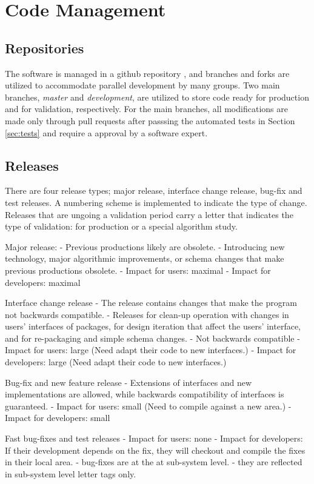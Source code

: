 \section{Code Management}

\subsection{Repositories}
The software is managed in a github repository \cite{recon-github}, and branches and forks are utilized to accommodate parallel development by many groups.  Two main branches, {\it master} and {\it development}, are utilized to store code ready for production and for validation, respectively. For the main branches, all modifications are made only through pull requests after passsing the automated tests in Section \ref{sec:tests} and require a approval by a software expert.

\subsection{Releases}
There are four release types; major release, interface change release, bug-fix
and test releases.  A numbering scheme is implemented to indicate the type of change.
Releases that are ungoing a validation period carry a letter that indicates the type of validation:
for production or a special algorithm study.

Major release:
- Previous productions likely are obsolete.
- Introducing new technology, major algorithmic improvements, or
schema changes that make previous productions obsolete.
- Impact for users: maximal
- Impact for developers: maximal

Interface change release
- The release contains changes that make the program not backwards compatible.
- Releases for clean-up operation with changes in users' interfaces of
packages, for design iteration that affect the users' interface, and
for re-packaging and simple schema changes.
- Not backwards compatible
- Impact for users: large (Need adapt their code to new interfaces.)
- Impact for developers: large (Need adapt their code to new interfaces.)

Bug-fix and new feature release
- Extensions of interfaces and new implementations are allowed, while
backwards compatibility of interfaces is guaranteed.
- Impact for users: small (Need to compile against a new area.)
- Impact for developers: small

Fast bug-fixes and test releases
- Impact for users: none
- Impact for developers: If their development depends on the fix, they will checkout
and compile the fixes in their local area.
- bug-fixes are at the at sub-system level.
- they are reflected in sub-system level letter tags only.

